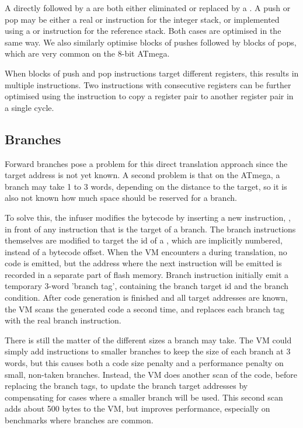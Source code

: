 A  directly followed by a  are both either eliminated or replaced by a . A push or pop may be either a real  or  instruction for the integer stack, or implemented using a  or  instruction for the reference stack. Both cases are optimised in the same way. We also similarly optimise blocks of pushes followed by blocks of pops, which are very common on the 8-bit ATmega. 

When blocks of push and pop instructions target different registers, this results in multiple  instructions. Two  instructions with consecutive registers can be further optimised using the  instruction to copy a register pair to another register pair in a single cycle.


\subsection{Branches}
Forward branches pose a problem for this direct translation approach since the target address is not yet known. A second problem is that on the ATmega, a branch may take 1 to 3 words, depending on the distance to the target, so it is also not known how much space should be reserved for a branch.

To solve this, the infuser modifies the bytecode by inserting a new instruction, , in front of any instruction that is the target of a branch. The branch instructions themselves are modified to target the id of a , which are implicitly numbered, instead of a bytecode offset. When the VM encounters a  during translation, no code is emitted, but the address where the next instruction will be emitted is recorded in a separate part of flash memory. Branch instruction initially emit a temporary 3-word 'branch tag', containing the branch target id and the branch condition. After code generation is finished and all target addresses are known, the VM scans the generated code a second time, and replaces each branch tag with the real branch instruction.

There is still the matter of the different sizes a branch may take. The VM could simply add  instructions to smaller branches to keep the size of each branch at 3 words, but this causes both a code size penalty and a performance penalty on small, non-taken branches. Instead, the VM does another scan of the code, before replacing the branch tags, to update the branch target addresses by compensating for cases where a smaller branch will be used. This second scan adds about 500 bytes to the VM, but improves performance, especially on benchmarks where branches are common.

